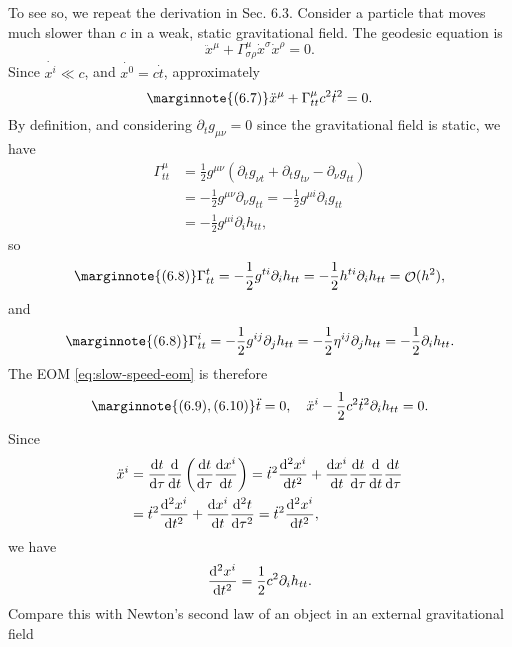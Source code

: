 \documentclass[hyperref, a4paper]{article}
\DeclareMathOperator{\bigO}{\mathcal{O}}
\begin{document}
To see so, we repeat the derivation in Sec. 6.3. 
Consider a particle that moves much slower than $c$ in a weak, static gravitational field. 
The geodesic equation is 
\[
    \ddot{x}^\mu + \Gamma^\mu_{\sigma \rho} \dot{x}^\sigma \dot{x}^\rho = 0.
\]
Since $\dot{x^i} \ll c$, and $\dot{x^0} = c \dot{t}$, approximately 
\begin{equation} \marginnote{(6.7)}
    \ddot{x}^\mu + \Gamma^{\mu}_{tt} c^2 \dot{t}^2 = 0.
    \label{eq:slow-speed-eom}
\end{equation}
By definition, and considering $\partial_t g_{\mu \nu} = 0$ since the gravitational field is static, we have 
\[
    \begin{aligned}
        \Gamma^\mu_{tt} &= \frac{1}{2} g^{\mu \nu} (\partial_t g_{\nu t} + \partial_t g_{t \nu} - \partial_\nu g_{tt}) \\
        &= - \frac{1}{2} g^{\mu \nu} \partial_\nu g_{tt} = - \frac{1}{2} g^{\mu i} \partial_i g_{tt} \\
        &=  - \frac{1}{2} g^{\mu i} \partial_i h_{tt},
    \end{aligned}
\]
so 
\begin{equation} \marginnote{(6.8)}
    \Gamma^{t}_{tt} = - \frac{1}{2} g^{t i} \partial_{i} h_{tt} = - \frac{1}{2} h^{ti} \partial_i h_{tt} = \bigO(h^2),
\end{equation}
and 
\begin{equation} \marginnote{(6.8)}
    \Gamma^{i}_{tt} = - \frac{1}{2} g^{i j} \partial_j h_{tt} = - \frac{1}{2} \eta^{ij} \partial_j h_{tt} = - \frac{1}{2} \partial_i h_{tt}.
    \label{eq:gamma-i-tt}
\end{equation}
The EOM \eqref{eq:slow-speed-eom} is therefore 
\begin{equation} \marginnote{(6.9), (6.10)}
    \ddot{t} = 0, \quad \ddot{x}^i - \frac{1}{2} c^2 \dot{t}^2 \partial_i h_{tt} = 0.
\end{equation}
Since 
\[
    \begin{aligned}
        \ddot{x}^i &= \dv{t}{\tau} \dv{t} \left( \dv{t}{\tau} \dv{x^i}{t} \right) = \dot{t}^2 \dv[2]{x^i}{t} + \dv{x^i}{t} \dv{t}{\tau} \dv{t} \dv{t}{\tau} \\
        &= \dot{t}^2 \dv[2]{x^i}{t} + \dv{x^i}{t} \dv[2]{t}{\tau} = \dot{t}^2 \dv[2]{x^i}{t},
    \end{aligned}
\]
we have 
\begin{equation}
    \dv[2]{x^i}{t} = \frac{1}{2} c^2 \partial_i h_{tt}.
\end{equation}
Compare this with Newton's second law of an object in an external gravitational field 
\end{document}
